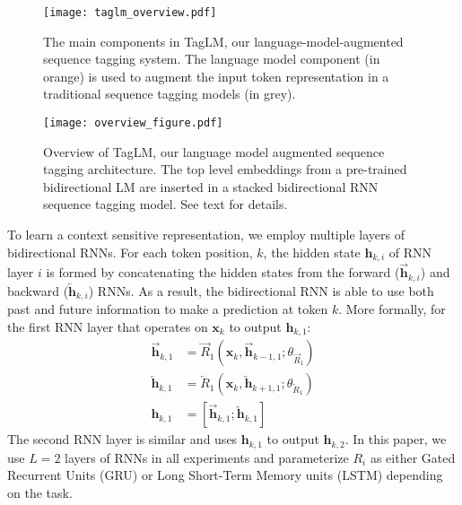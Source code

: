 \documentclass[11pt,a4paper]{article}
\begin{document}
\begin{figure}[t]
\begin{center}
\texttt{[image: taglm\_overview.pdf]}
\end{center}
\caption{\label{fig:major_components} The main components in TagLM, our language-model-augmented sequence tagging system. The language model component (in orange) is used to augment the input token representation in a traditional sequence tagging models (in grey).}
\end{figure}

\begin{figure*}[t]
\begin{center}
\texttt{[image: overview\_figure.pdf]}
\end{center}
\caption{\label{overview-figure} Overview of TagLM, our language model augmented sequence tagging architecture.  The top level embeddings from a pre-trained bidirectional LM
are inserted in a stacked bidirectional RNN sequence tagging model.  See text for details.}
\end{figure*}


To learn a context sensitive representation, we employ multiple layers of bidirectional RNNs.
For each token position, $k$, the hidden state
$\mathbf{h}_{k,i}$ of RNN layer $i$ is formed
by concatenating the hidden states from the forward ($\overrightarrow{\mathbf{h}}_{k,i}$) and backward ($\overleftarrow{\mathbf{h}}_{k,i}$) RNNs.  As a result, the bidirectional RNN is able to use both past and future information
to make a prediction at token $k$.  More formally, for the first RNN layer that operates on $\mathbf{x}_k$ to output $\mathbf{h}_{k,1}$:
\begin{align}
\overrightarrow{\mathbf{h}}_{k,1} & = \overrightarrow{R}_1 (\mathbf{x}_k, \overrightarrow{\mathbf{h}}_{k-1,1}; \theta_{\overrightarrow{R}_1}) \nonumber \\
\overleftarrow{\mathbf{h}}_{k,1} & = \overleftarrow{R}_1 (\mathbf{x}_k, \overleftarrow{\mathbf{h}}_{k+1,1}; \theta_{\overleftarrow{R}_1}) \nonumber \\
\mathbf{h}_{k,1} & = [\overrightarrow{\mathbf{h}}_{k,1}; \overleftarrow{\mathbf{h}}_{k,1}] \label{eqn:rnn1}
\end{align}
The second RNN layer is similar and uses $\mathbf{h}_{k,1}$ to output $\mathbf{h}_{k,2}$.
In this paper, we use $L=2$ layers of RNNs in all experiments and parameterize $R_i$ as either
Gated Recurrent Units (GRU) \citep{GRU:Cho2014} or
Long Short-Term Memory units (LSTM) \citep{LSTM:Hochreiter1997} depending on the task.
\end{document}

